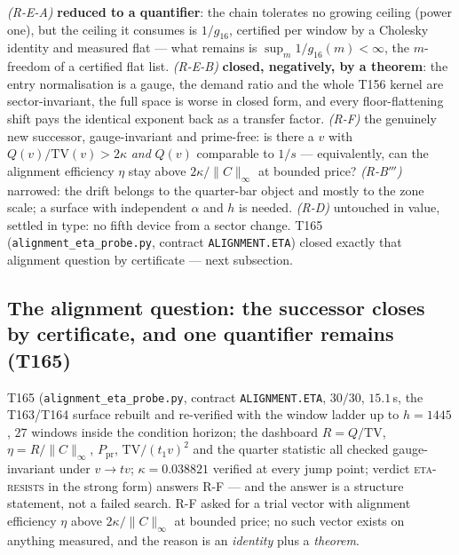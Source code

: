 \documentclass[11pt,a4paper]{article}
\begin{document}
\begin{keybox}
\emph{(R-E-A)} \textbf{reduced to a quantifier}: the chain tolerates no
growing ceiling (power one), but the ceiling it consumes is $1/g_{16}$,
certified per window by a Cholesky identity and measured flat --- what remains
is $\sup_m1/g_{16}(m)<\infty$, the $m$-freedom of a certified flat list.
\emph{(R-E-B)} \textbf{closed, negatively, by a theorem}: the entry
normalisation is a gauge, the demand ratio and the whole T156 kernel are
sector-invariant, the full space is worse in closed form, and every
floor-flattening shift pays the identical exponent back as a transfer factor.
\emph{(R-F)} the genuinely new successor, gauge-invariant and prime-free: is
there a $v$ with $Q(v)/\mathrm{TV}(v)>2\kappa$ \emph{and} $Q(v)$ comparable
to $1/s$ --- equivalently, can the alignment efficiency $\eta$ stay above
$2\kappa/\|C\|_\infty$ at bounded price? \emph{(R-B$'''$)} narrowed: the
drift belongs to the quarter-bar object and mostly to the zone scale; a
surface with independent $\alpha$ and $h$ is needed. \emph{(R-D)} untouched
in value, settled in type: no fifth device from a sector change. T165
(\texttt{alignment\_eta\_probe.py}, contract \texttt{ALIGNMENT.ETA}) closed
exactly that alignment question by certificate --- next subsection.
\end{keybox}

\subsection{The alignment question: the successor closes by certificate, and
one quantifier remains (T165)}
T165 (\texttt{alignment\_eta\_probe.py}, contract \texttt{ALIGNMENT.ETA},
$30/30$, $15.1$\,s, the T163/T164 surface rebuilt and re-verified with the
window ladder up to $h=1445$, $27$ windows inside the condition horizon; the
dashboard $R=Q/\mathrm{TV}$, $\eta=R/\|C\|_\infty$, $P_{\mathrm{pr}}$,
$\mathrm{TV}/(t_1v)^2$ and the quarter statistic all checked gauge-invariant
under $v\to tv$; $\kappa=0.038821$ verified at every jump point; verdict
\textsc{eta-resists} in the strong form) answers R-F --- and the answer is a
structure statement, not a failed search. R-F asked for a trial vector with
alignment efficiency $\eta$ above $2\kappa/\|C\|_\infty$ at bounded price; no
such vector exists on anything measured, and the reason is an \emph{identity}
plus a \emph{theorem}.
\end{document}
